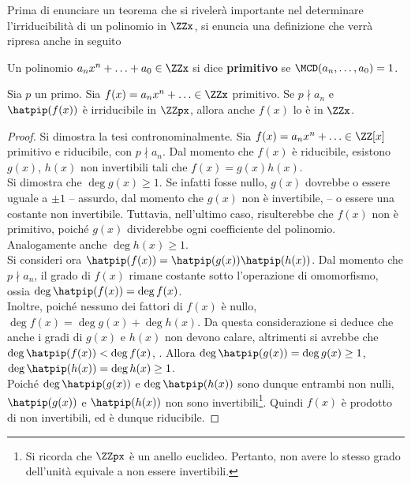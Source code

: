 Prima di enunciare un teorema che si rivelerà
importante nel determinare l'irriducibilità di un
polinomio in $\ZZx$, si enuncia una definizione che
verrà ripresa anche in seguito

\begin{definition}
    Un polinomio $a_n x^n + \ldots + a_0 \in \ZZx$ si dice
    \textbf{primitivo} se $\MCD(a_n, \ldots, a_0)=1$.
\end{definition}

\begin{theorem}
    \label{th:proiezione_irriducibilità}
    Sia $p$ un primo. Sia $f(x) = a_n x^n + \ldots \in \ZZx$
    primitivo. Se $p \nmid a_n$ e
    $\hatpip(f(x))$ è irriducibile in $\ZZpx$, allora anche $f(x)$ lo
    è in $\ZZx$.
\end{theorem}

\begin{proof}
    Si dimostra la tesi contronominalmente. Sia $f(x) =
        a_nx^n + \ldots \in \ZZ[x]$ primitivo e riducibile, con
    $p \nmid a_n$. Dal momento che $f(x)$ è riducibile, esistono
    $g(x)$, $h(x)$ non invertibili tali che $f(x)=g(x)h(x)$. \\

    Si dimostra che $\deg g(x) \geq 1$. Se infatti fosse nullo,
    $g(x)$ dovrebbe o essere uguale a $\pm 1$ -- assurdo, dal
    momento che $g(x)$ non è invertibile, \Lightning{} -- o
    essere una costante non invertibile. Tuttavia, nell'ultimo
    caso, risulterebbe che $f(x)$ non è primitivo, poiché
    $g(x)$ dividerebbe ogni coefficiente del polinomio.
    Analogamente anche $\deg h(x) \geq 1$. \\

    Si consideri ora $\hatpip(f(x))=\hatpip(g(x))\hatpip(h(x))$.
    Dal momento che $p \nmid a_n$, il grado di $f(x)$ rimane costante
    sotto l'operazione di omomorfismo, ossia $\deg \hatpip(f(x)) =
        \deg f(x)$. \\

    Inoltre, poiché nessuno dei fattori di $f(x)$ è nullo, $\deg f(x) = \deg g(x) +
        \deg h(x)$. Da questa considerazione si deduce che anche i
    gradi di $g(x)$ e $h(x)$ non devono calare, altrimenti si
    avrebbe che $\deg \hatpip(f(x)) < \deg f(x)$, \Lightning{}.
    Allora $\deg \hatpip(g(x)) = \deg g(x) \geq 1$,
    $\deg \hatpip(h(x)) = \deg h(x) \geq 1$. \\

    Poiché $\deg \hatpip(g(x))$ e $\deg \hatpip(h(x))$ sono
    dunque entrambi non nulli, $\hatpip(g(x))$ e $\hatpip(h(x))$
    non sono invertibili\footnote{Si ricorda che $\ZZpx$
        è un anello euclideo. Pertanto, non avere lo stesso grado
        dell'unità equivale a non essere invertibili.}. Quindi
    $f(x)$ è prodotto di non invertibili, ed è dunque riducibile.

\end{proof}

